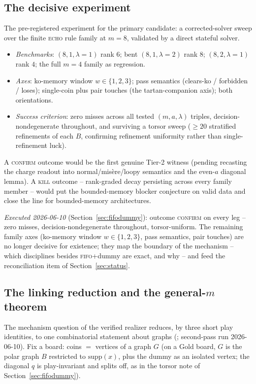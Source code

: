 \documentclass[11pt]{article}
\theoremstyle{plain}
\theoremstyle{definition}
\begin{document}
\subsection{The decisive experiment}\label{sec:decisive}

The pre-registered experiment for the primary candidate: a corrected-solver
sweep over the finite \textsc{echo} rule family at $m=8$, validated by a
direct stateful solver.
\begin{itemize}[leftmargin=*,itemsep=0pt]
\item \emph{Benchmarks}: $(8,1,\lambda=1)$ rank $6$; bent
$(8,1,\lambda=2)$ rank $8$; $(8,2,\lambda=1)$ rank $4$; the full $m=4$
family as regression.
\item \emph{Axes}: ko-memory window $w\in\{1,2,3\}$; pass semantics
(clears-ko / forbidden / loses); single-coin plus pair touches (the
tartan-companion axis); both orientations.
\item \emph{Success criterion}: zero misses across all tested
$(m,a,\lambda)$ triples, decision-nondegenerate throughout, and surviving a
torsor sweep ($\geq20$ stratified refinements of each $B$, confirming
refinement uniformity rather than single-refinement luck).
\end{itemize}
A \textsc{confirm} outcome would be the first genuine Tier-2 witness
(pending recasting the charge readout into normal/misère/loopy semantics
and the even-$a$ diagonal lemma). A \textsc{kill} outcome -- rank-graded
decay persisting across every family member -- would put the
bounded-memory blocker conjecture on valid data and close the line for
bounded-memory architectures.

\emph{Executed 2026-06-10} (Section~\ref{sec:fifodummy}): outcome
\textsc{confirm} on every leg -- zero misses, decision-nondegenerate
throughout, torsor-uniform. The remaining family axes (ko-memory window
$w\in\{1,2,3\}$, pass semantics, pair touches) are no longer decisive for
existence; they map the boundary of the mechanism -- which disciplines
besides \textsc{fifo}+dummy are exact, and why -- and feed the
reconciliation item of Section~\ref{sec:status}.

\subsection{The linking reduction and the general-$m$
theorem}\label{sec:linking}

The mechanism question of the verified realizer reduces, by three short
play identities, to one combinatorial statement about graphs
(; second-pass run 2026-06-10). Fix a
board: coins $=$ vertices of a graph $G$ (on a Gold board, $G$ is the
polar graph $B$ restricted to $\mathrm{supp}(x)$, plus the dummy as an
isolated vertex; the diagonal $q$ is play-invariant and splits off, as in
the torsor note of Section~\ref{sec:fifodummy}).
\end{document}
